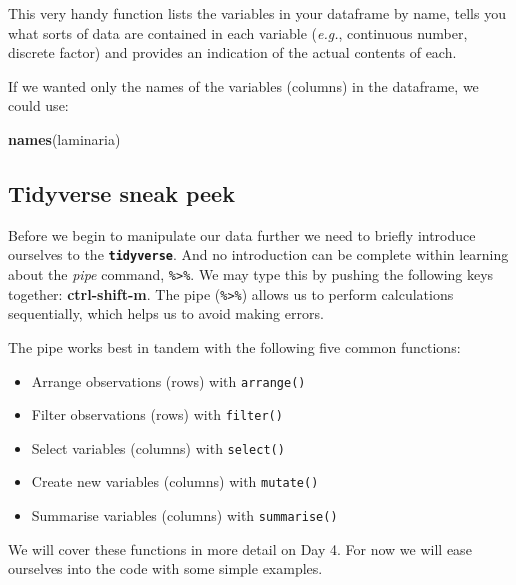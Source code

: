 \documentclass[
]{book}
\newenvironment{Shaded}{\begin{snugshade}}{\end{snugshade}}
\newcommand{\KeywordTok}[1]{\textcolor[rgb]{0.13,0.29,0.53}{\textbf{#1}}}
\newcommand{\NormalTok}[1]{#1}
\providecommand{\tightlist}{%
  \setlength{\itemsep}{0pt}\setlength{\parskip}{0pt}}
\begin{document}
This very handy function lists the variables in your dataframe by name, tells you what sorts of data are contained in each variable (\emph{e.g.}, continuous number, discrete factor) and provides an indication of the actual contents of each.

If we wanted only the names of the variables (columns) in the dataframe, we could use:

\begin{Shaded}
\begin{Highlighting}[]
\KeywordTok{names}\NormalTok{(laminaria)}
\end{Highlighting}
\end{Shaded}

\hypertarget{tidyverse-sneak-peek}{%
\subsection{Tidyverse sneak peek}\label{tidyverse-sneak-peek}}

Before we begin to manipulate our data further we need to briefly introduce ourselves to the \textbf{\texttt{tidyverse}}. And no introduction can be complete within learning about the \emph{pipe} command, \texttt{\%\textgreater{}\%}. We may type this by pushing the following keys together: \textbf{ctrl-shift-m}. The pipe (\texttt{\%\textgreater{}\%}) allows us to perform calculations sequentially, which helps us to avoid making errors.

The pipe works best in tandem with the following five common functions:

\begin{itemize}
\tightlist
\item
  Arrange observations (rows) with \texttt{arrange()}\\
\item
  Filter observations (rows) with \texttt{filter()}\\
\item
  Select variables (columns) with \texttt{select()}\\
\item
  Create new variables (columns) with \texttt{mutate()}\\
\item
  Summarise variables (columns) with \texttt{summarise()}
\end{itemize}

We will cover these functions in more detail on Day 4. For now we will ease ourselves into the code with some simple examples.
\end{document}

